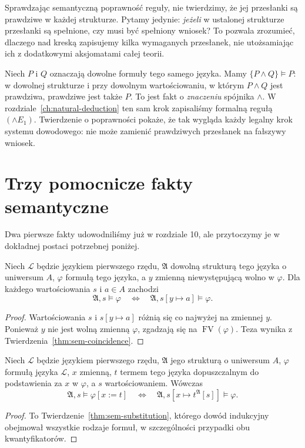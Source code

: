 \begin{przyklad}
Sprawdzając semantyczną poprawność reguły, nie twierdzimy,
że jej przesłanki są prawdziwe w każdej strukturze.
Pytamy jedynie: \emph{jeżeli} w ustalonej strukturze
przesłanki są spełnione, czy musi być spełniony wniosek?
To pozwala zrozumieć, dlaczego nad kreską zapisujemy
kilka wymaganych przesłanek, nie utożsamiając ich
z dodatkowymi aksjomatami całej teorii.

Niech $P$ i $Q$ oznaczają dowolne formuły tego samego języka.
Mamy $\{P\land Q\}\models P$: w dowolnej strukturze i przy
dowolnym wartościowaniu, w którym $P\land Q$ jest prawdziwa,
prawdziwe jest także $P$. To jest fakt o \emph{znaczeniu}
spójnika $\land$. W rozdziale~\ref{ch:natural-deduction}
ten sam krok zapisaliśmy formalną regułą $(\land E_1)$.
Twierdzenie o poprawności pokaże, że tak wygląda każdy
legalny krok systemu dowodowego: nie może zamienić
prawdziwych przesłanek na fałszywy wniosek.
\end{przyklad}

\section{Trzy pomocnicze fakty semantyczne}
Dwa pierwsze fakty udowodniliśmy już w rozdziale 10,
ale przytoczymy je w dokładnej postaci potrzebnej poniżej.

\begin{lemat}
\label{lem:soundness-fresh}
Niech $\mathcal L$ będzie językiem pierwszego rzędu,
$\mathfrak A$ dowolną strukturą tego języka o uniwersum $A$,
$\varphi$ formułą tego języka, a $y$ zmienną niewystępującą wolno
w $\varphi$. Dla każdego wartościowania $s$ i $a\in A$ zachodzi
\[
\mathfrak A,s\models\varphi
\quad\Longleftrightarrow\quad
\mathfrak A,s[y\mapsto a]\models\varphi.
\]
\end{lemat}
\begin{proof}
Wartościowania $s$ i $s[y\mapsto a]$ różnią się
co najwyżej na zmiennej $y$. Ponieważ $y$ nie jest
wolną zmienną $\varphi$, zgadzają się na
$\operatorname{FV}(\varphi)$. Teza wynika z
Twierdzenia~\ref{thm:sem-coincidence}.
\end{proof}

\begin{lemat}\label{lem:soundness-subst}
Niech $\mathcal L$ będzie językiem pierwszego rzędu,
$\mathfrak A$ jego strukturą o uniwersum $A$,
$\varphi$ formułą języka $\mathcal L$, $x$ zmienną,
$t$ termem tego języka dopuszczalnym do podstawienia
za $x$ w $\varphi$, a $s$ wartościowaniem.
Wówczas
\[
\mathfrak A,s\models\varphi[x:=t]
\quad\Longleftrightarrow\quad
\mathfrak A,s[x\mapsto t^{\mathfrak A}[s]]\models\varphi.
\]
\end{lemat}
\begin{proof}
To Twierdzenie~\ref{thm:sem-substitution},
którego dowód indukcyjny obejmował wszystkie rodzaje formuł,
w szczególności przypadki obu kwantyfikatorów.
\end{proof}

